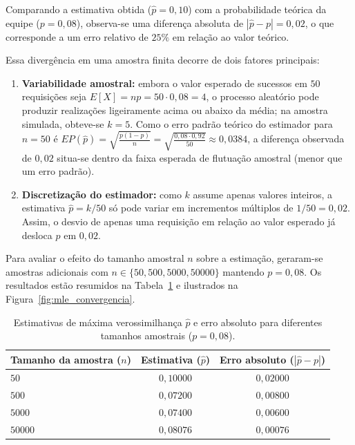 \documentclass[12pt,a4paper]{article}
\begin{document}
Comparando a estimativa obtida ($\hat{p} = 0{,}10$) com a probabilidade teórica da equipe ($p = 0{,}08$), observa-se uma diferença absoluta de $|\hat{p} - p| = 0{,}02$, o que corresponde a um erro relativo de $25\%$ em relação ao valor teórico.

Essa divergência em uma amostra finita decorre de dois fatores principais:
\begin{enumerate}
    \item \textbf{Variabilidade amostral:} embora o valor esperado de sucessos em $50$ requisições seja $E[X] = np = 50 \cdot 0{,}08 = 4$, o processo aleatório pode produzir realizações ligeiramente acima ou abaixo da média; na amostra simulada, obteve-se $k = 5$. Como o erro padrão teórico do estimador para $n = 50$ é $EP(\hat{p}) = \sqrt{\frac{p(1-p)}{n}} = \sqrt{\frac{0{,}08 \cdot 0{,}92}{50}} \approx 0{,}0384$, a diferença observada de $0{,}02$ situa-se dentro da faixa esperada de flutuação amostral (menor que um erro padrão).
    \item \textbf{Discretização do estimador:} como $k$ assume apenas valores inteiros, a estimativa $\hat{p} = k/50$ só pode variar em incrementos múltiplos de $1/50 = 0{,}02$. Assim, o desvio de apenas uma requisição em relação ao valor esperado já desloca $\hat{p}$ em $0{,}02$.
\end{enumerate}

Para avaliar o efeito do tamanho amostral $n$ sobre a estimação, geraram-se amostras adicionais com $n \in \{50, 500, 5000, 50000\}$ mantendo $p = 0{,}08$. Os resultados estão resumidos na Tabela~\ref{tab:mle_tamanhos} e ilustrados na Figura~\ref{fig:mle_convergencia}.

\begin{table}[H]
\centering
\caption{Estimativas de máxima verossimilhança $\hat{p}$ e erro absoluto para diferentes tamanhos amostrais ($p = 0{,}08$).}
\label{tab:mle_tamanhos}
\begin{tabular}{@{}lcc@{}}
\toprule
\textbf{Tamanho da amostra ($n$)} & \textbf{Estimativa ($\hat{p}$)} & \textbf{Erro absoluto ($|\hat{p} - p|$)} \\ \midrule
$50$     & $0{,}10000$ & $0{,}02000$ \\
$500$    & $0{,}07200$ & $0{,}00800$ \\
$5000$   & $0{,}07400$ & $0{,}00600$ \\
$50000$  & $0{,}08076$ & $0{,}00076$ \\ \bottomrule
\end{tabular}
\end{table}
\end{document}
